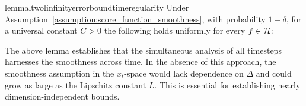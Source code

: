 \begin{restatable}{lemma}{ltwolinfinityerrorboundtimeregularity}\label{lemma:l2_linfnity_bound_f}
    Under Assumption~\ref{assumption:score_function_smoothness}, with probability $1-\delta$, for a universal constant $C  > 0$ the following holds uniformly for every $f \in \mathcal{H}$:
\end{restatable}
The above lemma establishes that the simultaneous analysis of all timesteps harnesses the smoothness across time. In the absence of this approach, the smoothness assumption in the $x_{t}$-space would lack dependence on $\Delta$ and could grow as large as the Lipschitz constant $L$. This is essential for establishing nearly dimension-independent bounds.
